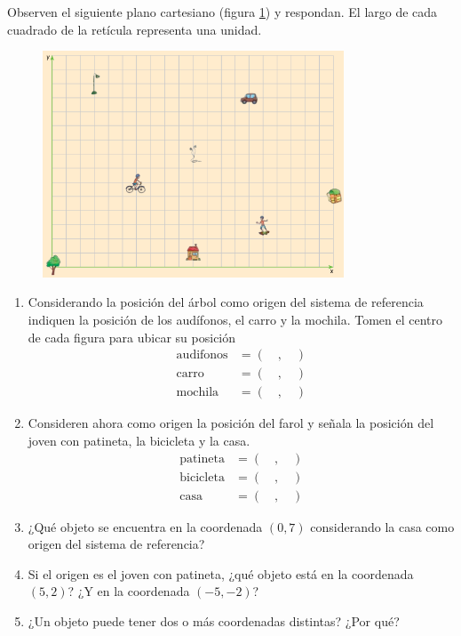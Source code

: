 \documentclass[11pt]{book}
\begin{document}
Observen el siguiente plano cartesiano (figura \ref{fig:plano01})  y respondan.
El largo de cada cuadrado de la retícula representa una unidad.
\begin{figure}[H]
    \centering
    \includegraphics[width=0.8\textwidth]{plano01.png}
    \label{fig:plano01}
\end{figure}
\begin{enumerate}
    \item Considerando la posición del árbol como origen del sistema de referencia indiquen la posición
          de los audífonos, el carro y la mochila. Tomen el centro de cada figura para ubicar su posición
          \begin{align*}
              \text{audifonos} & = ( \quad, \quad ) \\
              \text{carro}     & = ( \quad, \quad ) \\
              \text{mochila}   & = ( \quad, \quad )
          \end{align*}
    \item Consideren ahora como origen la posición del farol y señala la posición del joven con patineta,
          la bicicleta y la casa.
          \begin{align*}
              \text{patineta}  & = ( \quad, \quad ) \\
              \text{bicicleta} & = ( \quad, \quad ) \\
              \text{casa}      & = ( \quad, \quad )
          \end{align*}
    \item ¿Qué objeto se encuentra en la coordenada $(0, 7)$ considerando la casa como origen del sistema de
          referencia?
    \item Si el origen es el joven con patineta, ¿qué objeto está en la coordenada $(5, 2)$? ¿Y en la
          coordenada $(-5, -2)$?
    \item ¿Un objeto puede tener dos o más coordenadas distintas? ¿Por qué?


\end{enumerate}
\end{document}
